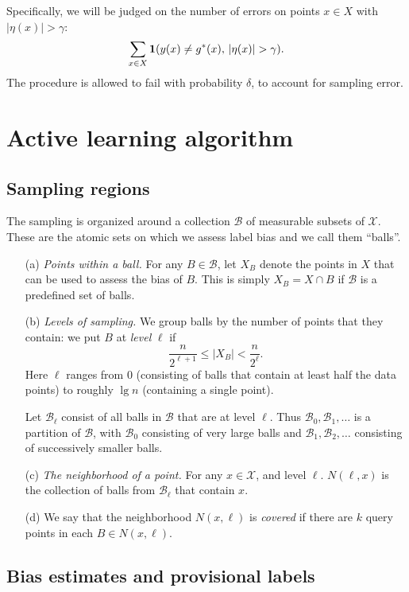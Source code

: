\documentclass[anon,12pt]{colt2022} %
\def\X{{\mathcal X}}
\def\B{{\mathcal B}}
\begin{document}
Specifically, we will be judged on the number of errors on points $x \in X$ with $|\eta(x)| > \gamma$:
$$ \sum_{x \in X} {\bf 1}(y(x) \neq g^*(x),\, |\eta(x)| > \gamma) .$$
The procedure is allowed to fail with probability $\delta$, to account for sampling error.


\section{Active learning algorithm}

\subsection{Sampling regions}

The sampling is organized around a collection $\B$ of measurable subsets of $\X$. These are the atomic sets on which we assess label bias and we call them ``balls''.

\begin{enumerate}

\item[(a)] \emph{Points within a ball.} For any $B \in \B$, let $X_B$ denote the points in $X$ that can be used to assess the bias of $B$. This is simply $X_B = X \cap B$ if $\B$ is a predefined set of balls. 
  
\item[(b)] \emph{Levels of sampling.} We group balls by the number of points that they contain: we put $B$ at {\it level} $\ell$ if
$$ \frac{n}{2^{\ell + 1}} \leq |X_B| < \frac{n}{2^\ell} .$$
Here $\ell$ ranges from $0$ (consisting of balls that contain at least half the data points) to roughly $\lg n$ (containing a single point). 

Let $\B_\ell$ consist of all balls in $\B$ that are at level $\ell$. Thus $\B_0, \B_1, \ldots$ is a partition of $\B$, with $\B_0$ consisting of very large balls and $\B_1, \B_2, \ldots$ consisting of successively smaller balls.

\item[(c)] \emph{The neighborhood of a point.} For any
  $x \in \X$, and level $\ell$.
  $N(\ell,x)$ is the collection of balls from $\B_\ell$ that
  contain $x$.
\item[(d)] We say that the neighborhood $N(x,\ell)$ is {\em covered}
  if there are $k$ query points in each $B \in N(x,\ell)$.
  
\end{enumerate}

\subsection{Bias estimates and provisional labels}
\end{document}
